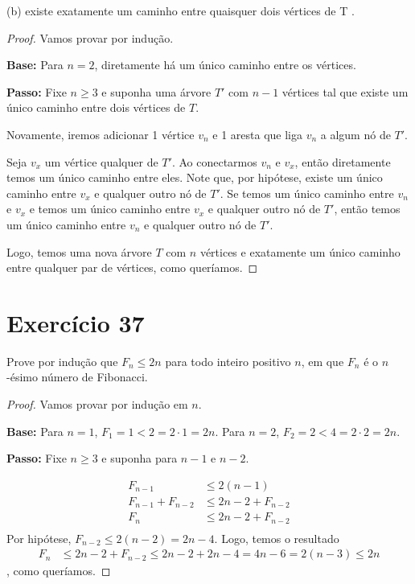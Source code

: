 \documentclass{article}
\newcommand{\base}{\textbf{Base: }}
\newcommand{\passo}{\textbf{Passo: }}
\begin{document}
(b) existe exatamente um caminho entre quaisquer dois vértices de T .
\begin{proof}
Vamos provar por indução.

\base Para $n=2$, diretamente há um único caminho entre os vértices.

\passo Fixe $n \geq 3$ e suponha uma árvore $T'$ com $n-1$ vértices tal que existe um único caminho entre dois vértices de $T$.

Novamente, iremos adicionar 1 vértice $v_n$ e 1 aresta que liga $v_n$ a algum nó de $T'$.

Seja $v_x$ um vértice qualquer de $T'$.
Ao conectarmos $v_n$ e $v_x$, então diretamente temos um único caminho entre eles.
Note que, por hipótese, existe um único caminho entre $v_x$ e qualquer outro nó de $T'$.
Se temos um único caminho entre $v_n$ e $v_x$ e temos um único caminho entre $v_x$ e qualquer outro nó de $T'$, então temos um único caminho entre $v_n$ e qualquer outro nó de $T'$.

Logo, temos uma nova árvore $T$ com $n$ vértices e exatamente um único caminho entre qualquer par de vértices, como queríamos.
\end{proof}

\section*{Exercício 37}
Prove por indução que $F_n \leq 2n$ para todo inteiro positivo $n$, em que $F_n$ é o $n$-ésimo número de Fibonacci.
\begin{proof}
Vamos provar por indução em $n$.

\base Para $n=1$, $F_1 = 1 < 2 = 2 \cdot 1 = 2n$.
Para $n=2$, $F_2 = 2 < 4 = 2 \cdot 2 = 2n$.

\passo Fixe $n \geq 3$ e suponha para $n-1$ e $n-2$.

\begin{align*}
    F_{n-1} &\leq 2(n-1) \\
    F_{n-1} + F_{n-2} &\leq 2n-2 + F_{n-2} \\
    F_n &\leq 2n-2 + F_{n-2} \\
\end{align*}
Por hipótese, $F_{n-2} \leq 2(n-2) = 2n - 4$. Logo, temos o resultado
\begin{align*}
    F_n &\leq 2n-2 + F_{n-2} \leq 2n-2 + 2n-4 = 4n - 6 = 2(n-3) \leq 2n
\end{align*}
, como queríamos.
\end{proof}
\end{document}
